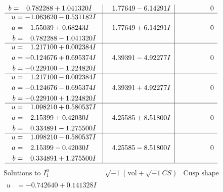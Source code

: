 \documentclass[1p]{elsarticle_modified}
\theoremstyle{definition}
\newcommand{\I}{\sqrt{-1}}
\begin{document}
$$\begin{array}{c|c|c}
\begin{aligned}
b &= \phantom{-}0.782288 + 1.041320 I\end{aligned}
 & \phantom{-}1.77649 - 6.14291 I & \phantom{-0.000000 } 0 \\ \hline\begin{aligned}
u &= -1.063620 - 0.531182 I \\
a &= \phantom{-}1.55039 + 0.68243 I \\
b &= \phantom{-}0.782288 - 1.041320 I\end{aligned}
 & \phantom{-}1.77649 + 6.14291 I & \phantom{-0.000000 } 0 \\ \hline\begin{aligned}
u &= \phantom{-}1.217100 + 0.002384 I \\
a &= -0.124676 + 0.695374 I \\
b &= -0.229100 - 1.224820 I\end{aligned}
 & \phantom{-}4.39391 - 4.92277 I & \phantom{-0.000000 } 0 \\ \hline\begin{aligned}
u &= \phantom{-}1.217100 - 0.002384 I \\
a &= -0.124676 - 0.695374 I \\
b &= -0.229100 + 1.224820 I\end{aligned}
 & \phantom{-}4.39391 + 4.92277 I & \phantom{-0.000000 } 0 \\ \hline\begin{aligned}
u &= \phantom{-}1.098210 + 0.580537 I \\
a &= \phantom{-}2.15399 + 0.42030 I \\
b &= \phantom{-}0.334891 - 1.275500 I\end{aligned}
 & \phantom{-}4.25585 + 8.51800 I & \phantom{-0.000000 } 0 \\ \hline\begin{aligned}
u &= \phantom{-}1.098210 - 0.580537 I \\
a &= \phantom{-}2.15399 - 0.42030 I \\
b &= \phantom{-}0.334891 + 1.275500 I\end{aligned}
 & \phantom{-}4.25585 - 8.51800 I & \phantom{-0.000000 } 0\\
 \hline 
 \end{array}$$\newpage$$\begin{array}{c|c|c}  
\text{Solutions to }I^u_{1}& \I (\text{vol} + \sqrt{-1}CS) & \text{Cusp shape}\\
 \hline 
\begin{aligned}
u &= -0.742640 + 0.141328 I \\

\end{aligned}
\end{array}$$
\end{document}
